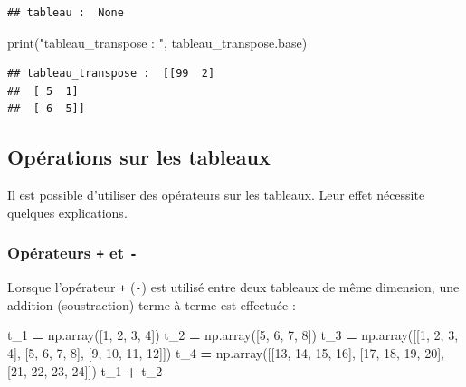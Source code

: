 \documentclass[12pt,]{book}
\newenvironment{Shaded}{\begin{snugshade}}{\end{snugshade}}
\newcommand{\DecValTok}[1]{\textcolor[rgb]{0.00,0.00,0.81}{#1}}
\newcommand{\StringTok}[1]{\textcolor[rgb]{0.31,0.60,0.02}{#1}}
\newcommand{\OperatorTok}[1]{\textcolor[rgb]{0.81,0.36,0.00}{\textbf{#1}}}
\newcommand{\BuiltInTok}[1]{#1}
\newcommand{\NormalTok}[1]{#1}
\numberwithin{equation}{section}
\numberwithin{countremarque}{section}
\begin{document}
\begin{lstlisting}
## tableau :  None
\end{lstlisting}

\begin{Shaded}
\begin{Highlighting}[]
\BuiltInTok{print}\NormalTok{(}\StringTok{"tableau_transpose : "}\NormalTok{, tableau_transpose.base)}
\end{Highlighting}
\end{Shaded}

\begin{lstlisting}
## tableau_transpose :  [[99  2]
##  [ 5  1]
##  [ 6  5]]
\end{lstlisting}

\subsection{Opérations sur les tableaux}\label{operations-tableaux}

Il est possible d'utiliser des opérateurs sur les tableaux. Leur effet
nécessite quelques explications.

\subsubsection{\texorpdfstring{Opérateurs \texttt{+} et
\texttt{-}}{Opérateurs + et -}}\label{operateurs-et--}

Lorsque l'opérateur \texttt{+} (\texttt{-}) est utilisé entre deux
tableaux de même dimension, une addition (soustraction) terme à terme
est effectuée :

\begin{Shaded}
\begin{Highlighting}[]
\NormalTok{t_1 }\OperatorTok{=}\NormalTok{ np.array([}\DecValTok{1}\NormalTok{, }\DecValTok{2}\NormalTok{, }\DecValTok{3}\NormalTok{, }\DecValTok{4}\NormalTok{])}
\NormalTok{t_2 }\OperatorTok{=}\NormalTok{ np.array([}\DecValTok{5}\NormalTok{, }\DecValTok{6}\NormalTok{, }\DecValTok{7}\NormalTok{, }\DecValTok{8}\NormalTok{])}
\NormalTok{t_3 }\OperatorTok{=}\NormalTok{ np.array([[}\DecValTok{1}\NormalTok{, }\DecValTok{2}\NormalTok{, }\DecValTok{3}\NormalTok{, }\DecValTok{4}\NormalTok{], [}\DecValTok{5}\NormalTok{, }\DecValTok{6}\NormalTok{, }\DecValTok{7}\NormalTok{, }\DecValTok{8}\NormalTok{], [}\DecValTok{9}\NormalTok{, }\DecValTok{10}\NormalTok{, }\DecValTok{11}\NormalTok{, }\DecValTok{12}\NormalTok{]])}
\NormalTok{t_4 }\OperatorTok{=}\NormalTok{ np.array([[}\DecValTok{13}\NormalTok{, }\DecValTok{14}\NormalTok{, }\DecValTok{15}\NormalTok{, }\DecValTok{16}\NormalTok{], [}\DecValTok{17}\NormalTok{, }\DecValTok{18}\NormalTok{, }\DecValTok{19}\NormalTok{, }\DecValTok{20}\NormalTok{], [}\DecValTok{21}\NormalTok{, }\DecValTok{22}\NormalTok{, }\DecValTok{23}\NormalTok{, }\DecValTok{24}\NormalTok{]])}
\NormalTok{t_1 }\OperatorTok{+}\NormalTok{ t_2}
\end{Highlighting}
\end{Shaded}
\end{document}
